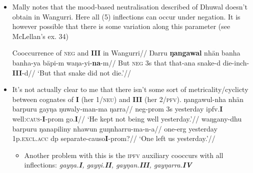 \begin{itemize}
	\item Mally notes that the mood-based neutralisation described of Dhuwal doesn't obtain in Wangurri. Here all (5) inflections can occur under negation. It is however possible that there is some variation along this parameter (see McLellan's ex. 34)
	
	\pex\begingl\glpreamble Cooccurrence of \textsc{neg} and \textbf{III} in Wangurri//
	\gla Ŋarru \textbf{ŋangawal} nhän banha banha-ya bäpi-m waŋa-yi-\textbf{na}-m//
	\glb But \textsc{neg} 3s that that-\gls{ana} snake-d die-\gls{inch}-\textbf{III}-d//
	\glft`But that snake did not die.'//\endgl\xe
	
	\item It's not actually clear to me that there isn't some sort of metricality/cyclicty between cognates of \textbf{I} (her \textsc{1/neu}) and \textbf{III} (her \textsc{2/pfv}).
	\pex\a
	\begingl\gla ŋangawul-nha nhän barpuru  gayŋa ŋuwaly-man-ma ŋarra//
	\glb \gls{neg}-\gls{prom} 3s yesterday \gls{ipfv}.\textbf{I} well:\textsc{caus}-\textbf{I}-\gls{prom} go.\textbf{I}//
	\glft`He kept not being well yesterday.'//\endgl
	\a \begingl\gla waŋgany-dhu barpuru ŋanapiliny nhawun guŋnharru-ma-n-a//
	\glb one-\gls{erg} yesterday 1p.\textsc{excl.acc} \gls{dp} separate-\gls{caus}o\textbf{I}-\gls{prom}?//
	\glft`One left us yesterday.'//\endgl 
	\xe
	\begin{itemize}
		\item Another problem with this is the \textsc{ipfv} auxiliary cooccurs with all inflections: \textit{gayŋa.\textbf{I}, gayŋi.\textbf{II}, gayŋan.\textbf{III}, gayŋarra.\textbf{IV}}
		

\end{itemize}
\end{itemize}
